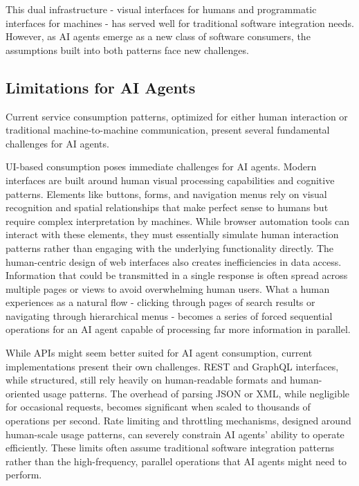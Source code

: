 \documentclass{article}
\begin{document}
This dual infrastructure - visual interfaces for humans and programmatic interfaces for machines - has served well for traditional software integration needs. However, as AI agents emerge as a new class of software consumers, the assumptions built into both patterns face new challenges.


\subsection{Limitations for AI Agents}
\label{subsec:interfaces_limitations}
Current service consumption patterns, optimized for either human interaction or traditional machine-to-machine communication, present several fundamental challenges for AI agents.

UI-based consumption poses immediate challenges for AI agents. Modern interfaces are built around human visual processing capabilities and cognitive patterns. Elements like buttons, forms, and navigation menus rely on visual recognition and spatial relationships that make perfect sense to humans but require complex interpretation by machines. While browser automation tools can interact with these elements, they must essentially simulate human interaction patterns rather than engaging with the underlying functionality directly. The human-centric design of web interfaces also creates inefficiencies in data access. Information that could be transmitted in a single response is often spread across multiple pages or views to avoid overwhelming human users. What a human experiences as a natural flow - clicking through pages of search results or navigating through hierarchical menus - becomes a series of forced sequential operations for an AI agent capable of processing far more information in parallel.

While APIs might seem better suited for AI agent consumption, current implementations present their own challenges. REST and GraphQL interfaces, while structured, still rely heavily on human-readable formats and human-oriented usage patterns. The overhead of parsing JSON or XML, while negligible for occasional requests, becomes significant when scaled to thousands of operations per second.
Rate limiting and throttling mechanisms, designed around human-scale usage patterns, can severely constrain AI agents' ability to operate efficiently. These limits often assume traditional software integration patterns rather than the high-frequency, parallel operations that AI agents might need to perform.
\end{document}

